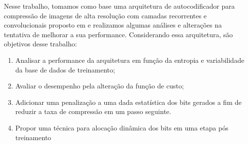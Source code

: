 Nesse trabalho, tomamos como base uma arquitetura de autocodificador para compressão de imagens de alta resolução com camadas recorrentes e convolucionais proposto em \cite{FullResolution2017Toderici} e realizamos algumas análises e alterações na tentativa de melhorar a sua performance. Considerando essa arquitetura, são objetivos desse trabalho:

\begin{enumerate}
	\item Analisar a performance da arquitetura em função da entropia e variabilidade da base de dados de treinamento;
	\item Avaliar o desempenho pela alteração da função de custo;
	\item Adicionar uma penalização a uma dada  estatística dos bits gerados a fim de reduzir a taxa de compressão em um passo seguinte.
	\item Propor uma técnica para alocação dinâmica dos bits em uma etapa pós treinamento
\end{enumerate}











